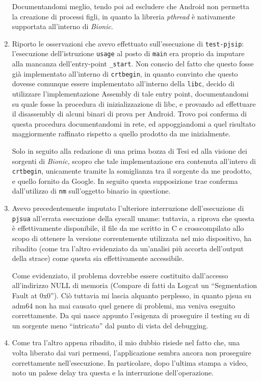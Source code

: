 \begin{enumerate}
	Documentandomi meglio, tendo poi 
	ad escludere che Android non permetta la creazione
	di processi figli, in quanto la libreria \textit{pthread} è 
	nativamente supportata all'interno di \textit{Bionic}.
\item Riporto le osservazioni che avevo effettuato sull'esecuzione di \texttt{\small test-pjsip}:
	l'esecuzione dell'istruzione \texttt{\small usage} al posto di \texttt{\small main}
	era proprio da imputare alla mancanza dell'entry-point \texttt{\small\_start}.
	Non conscio del fatto che questo fosse già implementato all'interno di
	\texttt{\small crtbegin}, in quanto convinto che questo dovesse comunque essere 
	implementato all'interno della \texttt{\small libc}, decido di utilizzare l'implementazione
	Assembly di tale entry point, documentandomi su quale fosse la procedura
	di inizializzazione di libc, e provando ad effettuare il disassembly
	di alcuni binari di prova per Android. Trovo poi conferma di questa
	procedura documentandomi in rete, ed appoggiandomi a quel risultato 
	maggiormente raffinato rispetto a quello prodotto da me inizialmente.
	
	Solo in seguito alla redazione di una prima bozza di Tesi ed alla
	visione dei sorgenti di \textit{Bionic}, scopro che tale implementazione era contenuta all'intero
	di \texttt{crtbegin}, unicamente tramite la somiglianza tra il sorgente da
	me prodotto, e quello fornito da Google. In seguito questa supposizione
	trae conferma dall'utilizzo di \texttt{nm} sull'oggetto binario in questione.





\item Avevo precedentemente imputato l'ulteriore interruzione dell'esecuzione
	di \texttt{\small pjsua} all'errata esecuzione della syscall uname: tuttavia, a riprova
	che questa è effettivamente disponibile, il file da me scritto in C e
	crosscompilato allo scopo di ottenere la versione correntemente 
	utilizzata nel mio dispositivo, ha ribadito (come tra l'altro evidenziato
	da un'analisi più accorta dell'output della strace) come questa sia
	effettivamente accessibile.
	
	Come evidenziato, il problema dovrebbe essere costituito dall'accesso
	all'indirizzo NULL di memoria (Compare di fatti da Logcat un ``Segmentation Fault 
	at 0x0''). Ciò tuttavia mi lascia alquanto perplesso, in quanto pjsua su adm64
	non ha mai causato quel genere di problemi, ma veniva eseguito correttamente.
	Da qui nasce appunto l'esigenza di proseguire il testing su di un
	sorgente meno ``intricato'' dal punto di vista del debugging.
\item Come tra l'altro appena ribadito, il mio dubbio
	risiede nel fatto che, una volta liberato dai 
	vari permessi, l'applicazione sembra ancora non proseguire correttamente
	nell'esecuzione. In particolare, dopo l'ultima stampa a video, 
	noto un palese delay tra questa e la interruzione dell'operazione.
	

\end{enumerate}
